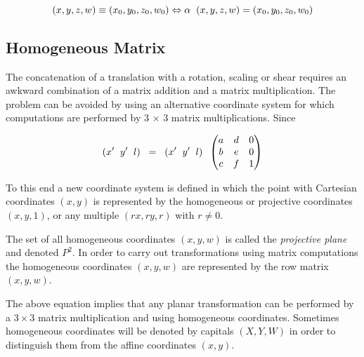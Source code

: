 \documentclass[12pt]{report}
\begin{document}
\begin{center} 
\[ (x, y, z, w) \equiv (x_{0}, y_{0}, z_{0}, w_{0})   \Leftrightarrow \alpha \hspace{0.2cm} (x, y, z, w) =  (x_{0}, y_{0}, z_{0}, w_{0})  \]
\end{center}


\subsection{Homogeneous Matrix}

\noindent The concatenation of a translation with a rotation, scaling or shear requires an awkward combination of a matrix addition and a matrix multiplication. The problem can be avoided by using an alternative coordinate system for which computations are performed by 3 × 3 matrix multiplications. Since 

\begin{center}
\[ (x' \hspace{.2cm}  y' \hspace{.2cm}  l ) \hspace{.2cm} = \hspace{.2cm} (x' \hspace{.2cm}  y' \hspace{.2cm} l )    \hspace{0.2cm} \begin{pmatrix}
a & d & 0 \\
b & e & 0 \\
c & f & 1 
\end{pmatrix} \]
  
\end{center}

To this end a new coordinate system is defined in which the point with Cartesian coordinates $ (x , y) $ is represented by the homogeneous or projective coordinates $( x , y , 1 )$, or any multiple $( rx , ry , r )$ with $ r \neq 0 $.


\vspace{.5cm}
The set of all homogeneous coordinates $(x , y , w)$ is called the \textit{projective plane} and denoted $ P^2 $. In order to carry out transformations using matrix computations the homogeneous coordinates $( x, y, w )$ are represented by the row matrix $(x, y, w)$. 

\vspace{.5cm}

\hspace{1cm} The above equation implies that any planar transformation can be performed by a $ 3 × 3 $ matrix multiplication and using homogeneous coordinates. Sometimes homogeneous coordinates will be denoted by capitals $ (X, Y, W) $  in order to distinguish them from the affine coordinates $(x, y)$.
\end{document}
